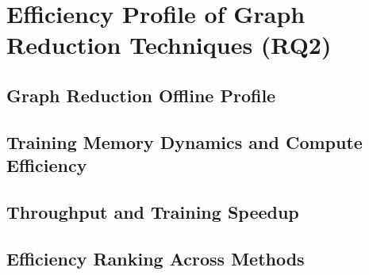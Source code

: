\section{Efficiency Profile of Graph Reduction Techniques (RQ2)}
\label{sec:results:rq2}

\subsection{Graph Reduction Offline Profile}
\label{sec:results:rq2:offline}

\subsection{Training Memory Dynamics and Compute Efficiency}
\label{sec:results:rq2:memory}

\subsection{Throughput and Training Speedup}
\label{sec:results:rq2:throughput}

\subsection{Efficiency Ranking Across Methods}
\label{sec:results:rq2:ranking}

